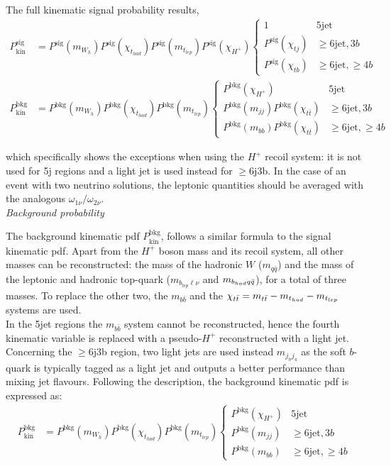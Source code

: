 The full kinematic signal probability results,
\begin{align}
    P_{\text{kin}}^{\text{sig}}&=P^{\text{sig}}(m_{W_h})P^{\text{sig}}(\chi_{t_{had}})P^{\text{sig}}(m_{t_{lep}})P^{\text{sig}}(\chi_{H^+})\begin{cases}1 & 5\text{jet} \\ P^{\text{sig}}(\chi_{tj})&\geq6\text{jet},3b\\P^{\text{sig}}(\chi_{tb})& \geq6\text{jet},\geq4b\end{cases}\\
     P_{\text{kin}}^{\text{bkg}}&=P^{\text{bkg}}(m_{W_h})P^{\text{bkg}}(\chi_{t_{had}})P^{\text{bkg}}(m_{t_{lep}})\begin{cases}P^{\text{bkg}}(\chi_{H^+}) & 5\text{jet} \\ P^{\text{bkg}}(m_{jj})P^{\text{bkg}}(\chi_{t\bar{t}})&\geq6\text{jet},3b\\P^{\text{bkg}}(m_{bb})P^{\text{bkg}}(\chi_{t\bar{t}})& \geq6\text{jet},\geq4b\end{cases}
\end{align}

which specifically shows the exceptions when using the $H^+$ recoil system: it is not used for 5j regions and a light jet is used instead for $\geq$6j3b.
In the case of an event with two neutrino solutions, the leptonic quantities should be averaged with the analogous $\omega_{1\nu}/\omega_{2\nu}$.\\


\textit{Background probability}

The background kinematic pdf $P_{\text{kin}}^{\text{bkg}}$, follows a similar formula to the signal kinematic pdf. Apart from the $H^+$ boson mass and its recoil system, all other masses can be reconstructed: the mass of the hadronic $W$ ($m_{q\bar{q}}$) and the mass of the leptonic and hadronic top-quark ($m_{b_{lep}\ell\nu}$ and $m_{b_{had}q\Bar{q}}$), for a total of three masses. To replace the other two, the $m_{b\bar{b}}$ and the $\chi_{t\bar{t}}=m_{t\bar{t}}-m_{t_{had}}-m_{t_{lep}}$ systems are used.\\

In the 5jet regions the $m_{b\bar{b}}$ system cannot be reconstructed, hence the fourth kinematic variable is replaced with a pseudo-$H^+$ reconstructed with a light jet. Concerning the $\geq$6j3b region, two light jets are used instead $m_{j_hj_4}$ as the soft $b$-quark is typically tagged as a light jet and outputs a better performance than mixing jet flavours. Following the description, the background kinematic pdf is expressed as:
\begin{align}
    P_{\text{kin}}^{\text{bkg}}&=P^{\text{bkg}}(m_{W_h})P^{\text{bkg}}(\chi_{t_{had}})P^{\text{bkg}}(m_{t_{lep}})\begin{cases}P^{\text{bkg}}(\chi_{H^+}) & 5\text{jet} \\ P^{\text{bkg}}(m_{jj})&\geq6\text{jet},3b\\P^{\text{bkg}}(m_{bb})& \geq6\text{jet},\geq4b\end{cases}
\end{align}

